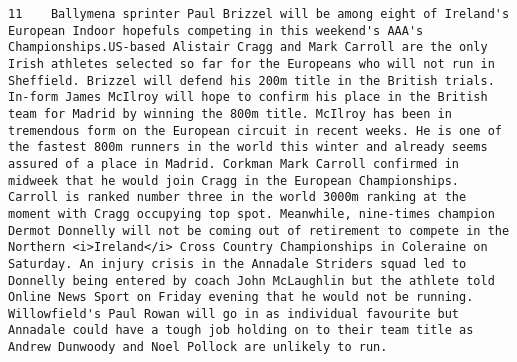 \documentclass[11pt]{article}
\begin{document}
\begin{Verbatim}[commandchars=\\\{\}]
         11    Ballymena sprinter Paul Brizzel will be among eight of Ireland's European Indoor hopefuls competing in this weekend's AAA's Championships.US-based Alistair Cragg and Mark Carroll are the only Irish athletes selected so far for the Europeans who will not run in Sheffield. Brizzel will defend his 200m title in the British trials. In-form James McIlroy will hope to confirm his place in the British team for Madrid by winning the 800m title. McIlroy has been in tremendous form on the European circuit in recent weeks. He is one of the fastest 800m runners in the world this winter and already seems assured of a place in Madrid. Corkman Mark Carroll confirmed in midweek that he would join Cragg in the European Championships. Carroll is ranked number three in the world 3000m ranking at the moment with Cragg occupying top spot. Meanwhile, nine-times champion Dermot Donnelly will not be coming out of retirement to compete in the Northern <i>Ireland</i> Cross Country Championships in Coleraine on Saturday. An injury crisis in the Annadale Striders squad led to Donnelly being entered by coach John McLaughlin but the athlete told Online News Sport on Friday evening that he would not be running. Willowfield's Paul Rowan will go in as individual favourite but Annadale could have a tough job holding on to their team title as Andrew Dunwoody and Noel Pollock are unlikely to run.                                                                                                                                                                                                                                                                                                                                                                                                                                                                                                                                                                                                                                                                                                                                                                                                                                                                                                                                                                                                                                                                                                                                                                                                                                                                                                                                                                                                                                                                                                                                                                                                                                                                                                                                                                                                                                                                                                                                                                            
\end{Verbatim}
\end{document}
